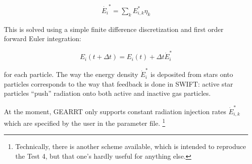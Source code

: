 \begin{align}
    \dot{E_i}^* = \sum_k E_{i,k}^* \eta_k \label{eq:injection_onto_particle}
\end{align}

This is solved using a simple finite difference discretization and first order
forward Euler integration:

\begin{equation}
    E_i(t + \Delta t) = E_i(t) + \Delta t \dot{E}_i^*
\end{equation}

for each particle. The way the energy density $\dot{E}_i^*$ is deposited from
stars onto particles corresponds to the way that feedback is done in SWIFT:
active star particles ``push'' radiation onto both active and inactive gas particles.

At the moment, GEARRT only supports constant radiation injection rates $\dot{E}_{i,k}^*$
which are specified by the user in the parameter file.
\footnote{Technically, there is another scheme available, which is intended to reproduce 
the \citet{ilievCosmologicalRadiativeTransfer2006} Test 4, but that one's hardly useful for 
anything else.}




